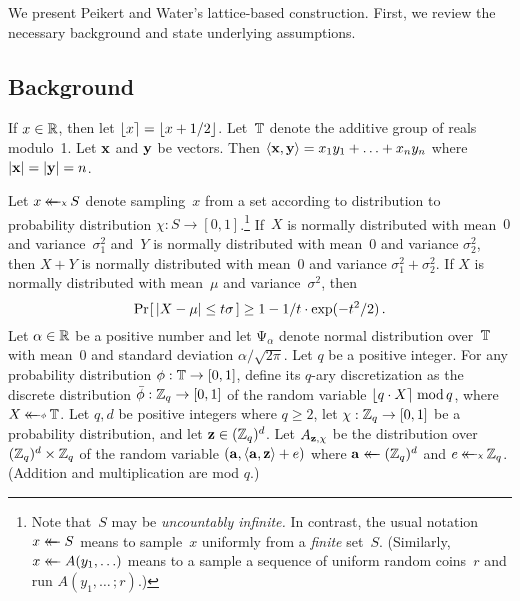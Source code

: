 We present Peikert and Water's lattice-based construction. First, we review the
necessary background and state underlying assumptions.

\subsection{Background}
If $x \in \mathbb{R}$, then let $\lfloor x\rceil=\lfloor x+1/2 \rfloor$.
%
Let~$\mathbb{T}$ denote the additive group of reals modulo~1.
%
Let $\mathbf{x}$ and $\mathbf{y}$ be vectors.  Then $\langle\mathbf{x},\mathbf{y}\rangle =
x_1 y_1 + \ldots + x_n y_n$ where $|\mathbf{x}| = |\mathbf{y}| = n$.

Let $x \getsdist{\chi} S$ denote sampling~$x$ from a set according to
distribution to probability distribution $\chi : S \to [0,1]$.\footnote{Note
that~$S$ may be \emph{uncountably infinite.} In contrast, the usual notation $x \mathrel{\leftarrow\mkern-14mu\leftarrow} S$ means
to sample~$x$ uniformly from a \emph{finite} set~$S$.  (Similarly, $x \mathrel{\leftarrow\mkern-14mu\leftarrow}
A(y_1, \ldots)$ means to a sample a sequence of uniform random coins~$r$ and run
$A(y_1, \ldots \,;r)$.)}
%
If~$X$ is normally distributed with mean~$0$ and variance~$\sigma_1^2$ and~$Y$
is normally distributed with mean~$0$ and variance $\sigma_2^2$, then $X+Y$ is
normally distributed with mean~$0$ and variance $\sigma_1^2 + \sigma_2^2$.
%
If $X$ is normally distributed with mean~$\mu$ and variance~$\sigma^2$,
then
\[
  {\Pr\hspace{-1pt}\left[\,{ |X-\mu| \leq t\sigma }\,\right]} \geq 1-1/t \cdot \exp(-t^2/2) \,.
\]
\fi
%
Let $\alpha \in\mathbb{R}$ be a positive number and let $\mathrm{\Psi}_\alpha$ denote
normal distribution over~$\mathbb{T}$ with mean~$0$ and standard deviation
$\alpha/\sqrt{2\pi}$.
%
Let $q$ be a positive integer.  For any probability distribution $\phi : \mathbb{T} \to
[0,1]$, define its $q$-ary discretization as the discrete distribution
$\bar{\phi} : \mathbb{Z}_q \to [0,1]$ of the random variable $\lfloor q \cdot X\rceil \mathrm{\;mod\,}
q$, where $X \getsdist{\phi} \T$.
%
Let $q,d$ be positive integers where $q \geq 2$,  let $\chi : \mathbb{Z}_q
\to [0,1]$ be a probability distribution, and let $\mathbf{z} \in (\mathbb{Z}_q)^d$. Let
$A_{\mathbf{z},\chi}$ be the distribution over $(\mathbb{Z}_q)^d \times \mathbb{Z}_q$ of the random
variable $(\mathbf{a}, \langle\mathbf{a},\mathbf{z}\rangle + e)$ where $\mathbf{a} \mathrel{\leftarrow\mkern-14mu\leftarrow} (\mathbb{Z}_q)^d$ and
$e \getsdist{\chi} \Z_q$. (Addition and multiplication are mod $q$.)

